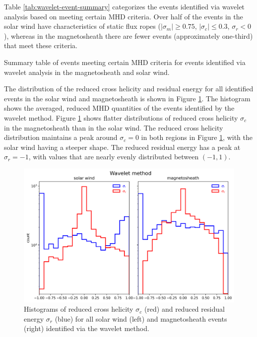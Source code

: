 Table \ref{tab:wavelet-event-summary} categorizes the events identified via wavelet analysis based on meeting certain MHD criteria. Over half of the events in the solar wind have characteristics of static flux ropes ($|\sigma_m|\geq 0.75$, $|\sigma_c|\leq 0.3$, $\sigma_r<0$), whereas in the magnetosheath there are fewer events (approximately one-third) that meet these criteria.
\begin{table}
    \centering
    \caption{Summary table of events meeting certain MHD criteria for events identified via wavelet analysis in the magnetosheath and solar wind.}
    \label{tab:wavelet-event-summary}
    
\end{table}
The distribution of the reduced cross helicity and residual energy for all identified events in the solar wind and magnetosheath is shown in Figure \ref{fig:mhd_histogram-wavelet}. The histogram shows the averaged, reduced MHD quantities of the events identified by the wavelet method. Figure \ref{fig:mhd_histogram-wavelet} shows flatter distributions of reduced cross helicity $\sigma_c$ in the magnetosheath than in the solar wind. The reduced cross helicity distribution maintains a peak around $\sigma_c=0$ in both regions in Figure \ref{fig:mhd_histogram-wavelet}, with the solar wind having a steeper shape. The reduced residual energy has a peak at $\sigma_r=-1$, with values that are nearly evenly distributed between $(-1,1)$.

\begin{figure}
    \centering
    \includegraphics[width=\textwidth]{Figures/Histograms/sigr_sigc_wavelet.png}
    \caption[Reduced cross helicity and reduced residual energy for all events identified via wavelet analysis]{Histograms of reduced cross helicity $\sigma_c$ (red) and reduced residual energy $\sigma_r$ (blue) for all solar wind (left) and magnetosheath events (right) identified via the wavelet method.}
    \label{fig:mhd_histogram-wavelet}
\end{figure}